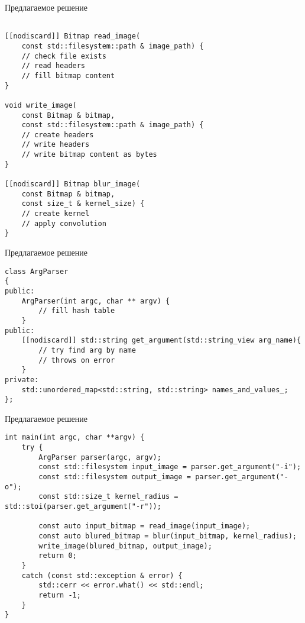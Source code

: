 \documentclass{beamer}
\begin{document}
\begin{frame}[fragile]{Предлагаемое решение}
    \small
    \begin{lstlisting}

[[nodiscard]] Bitmap read_image(
    const std::filesystem::path & image_path) {
    // check file exists
    // read headers
    // fill bitmap content
}

void write_image(
    const Bitmap & bitmap,
    const std::filesystem::path & image_path) {
    // create headers
    // write headers
    // write bitmap content as bytes
}

[[nodiscard]] Bitmap blur_image(
    const Bitmap & bitmap,
    const size_t & kernel_size) {
    // create kernel
    // apply convolution
}
    \end{lstlisting}
\end{frame}

\begin{frame}[fragile]{Предлагаемое решение}
    \small
    \begin{lstlisting}
class ArgParser
{
public:
    ArgParser(int argc, char ** argv) {
        // fill hash table
    }
public:
    [[nodiscard]] std::string get_argument(std::string_view arg_name){
        // try find arg by name
        // throws on error
    }
private:
    std::unordered_map<std::string, std::string> names_and_values_;
};
    \end{lstlisting}
\end{frame}

\begin{frame}[fragile]{Предлагаемое решение}
    \small
    \begin{lstlisting}
int main(int argc, char **argv) {
    try {
        ArgParser parser(argc, argv);
        const std::filesystem input_image = parser.get_argument("-i");
        const std::filesystem output_image = parser.get_argument("-o");
        const std::size_t kernel_radius = std::stoi(parser.get_argument("-r"));

        const auto input_bitmap = read_image(input_image);
        const auto blured_bitmap = blur(input_bitmap, kernel_radius);
        write_image(blured_bitmap, output_image);
        return 0;
    }
    catch (const std::exception & error) {
        std::cerr << error.what() << std::endl;
        return -1;
    }
}
    \end{lstlisting}
\end{frame}
\end{document}
